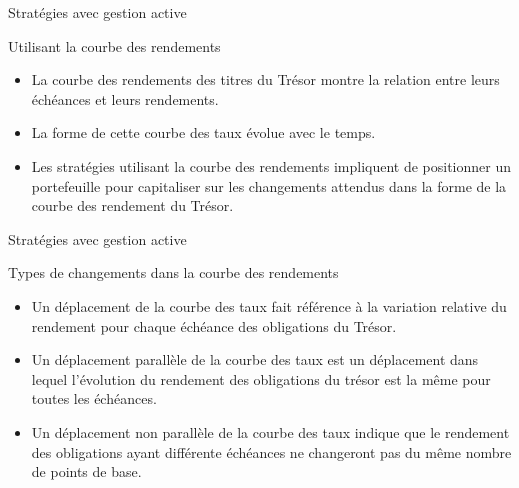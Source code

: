 \documentclass[10pt,a4paper]{beamer}
\begin{document}
\begin{frame}{Stratégies avec gestion active}
\begin{block}{Utilisant la courbe des rendements}
\begin{itemize}[label=\bullet]
\item La courbe des rendements des titres du Trésor montre la relation entre leurs échéances et leurs rendements.
\item La forme de cette courbe des taux évolue avec le temps.
\item Les stratégies utilisant la courbe des rendements impliquent de positionner un portefeuille pour capitaliser sur les changements attendus dans la forme de la courbe des rendement du Trésor.
\end{itemize}
\end{block}
\end{frame}


\begin{frame}{Stratégies avec gestion active}
\begin{block}{Types de changements dans la courbe des rendements}
\begin{itemize}[label=\bullet]
\item Un déplacement de la courbe des taux fait référence à la variation relative du rendement pour chaque échéance des obligations du Trésor.
\item Un déplacement parallèle de la courbe des taux est un déplacement dans lequel l'évolution du rendement des obligations du trésor est la même pour toutes les échéances.
\item Un déplacement non parallèle de la courbe des taux indique que le rendement des obligations ayant différente échéances ne changeront pas du même nombre de points de base.
\end{itemize}
\end{block}
\end{frame}
\end{document}

